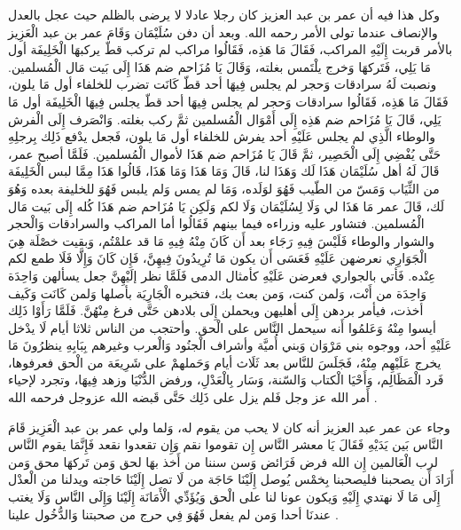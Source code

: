 وكل هذا فيه أن عمر بن عبد العزيز كان رجلا عادلا لا يرضى بالظلم حيث عجل بالعدل والإنصاف عندما تولى الأمر رحمه الله. وبعد أن دفن سُلَيْمَان وَقَامَ عمر بن عبد الْعَزِيز بالأمر قربت إِلَيْهِ المراكب، فَقَالَ مَا هَذِه، فَقَالُوا مراكب لم تركب قطّ يركبهَا الْخَلِيفَة أول مَا يَلِي، فَتَركهَا وَخرج يلْتَمس بغلته، وَقَالَ يَا مُزَاحم ضم هَذَا إِلَى بَيت مَال الْمُسلمين. ونصبت لَهُ سرادقات وَحجر لم يجلس فِيهَا أحد قطّ كَانَت تضرب للخلفاء أول مَا يلون، فَقَالَ مَا هَذِه، فَقَالُوا سرادقات وَحجر لم يجلس فِيهَا أحد قطّ يجلس فِيهَا الْخَلِيفَة أول مَا يَلِي، قَالَ يَا مُزَاحم ضم هَذِه إِلَى أَمْوَال الْمُسلمين ثمَّ ركب بغلته. وَانْصَرف إِلَى الْفرش والوطاء الَّذِي لم يجلس عَلَيْهِ أحد يفرش للخلفاء أول مَا يلون، فَجعل يدْفع ذَلِك بِرجلِهِ حَتَّى يُفْضِي إِلَى الْحَصِير، ثمَّ قَالَ يَا مُزَاحم ضم هَذَا لأموال الْمُسلمين. فَلَمَّا أصبح عمر، قَالَ لَهُ أهل سُلَيْمَان هَذَا لَك وَهَذَا لنا، قَالَ وَمَا هَذَا وَمَا هَذَا، قَالُوا هَذَا مِمَّا لبس الْخَلِيفَة من الثِّيَاب وَمَسّ من الطّيب فَهُوَ لوَلَده، وَمَا لم يمس وَلم يلبس فَهُوَ للخليفة بعده وَهُوَ لَك، قَالَ عمر مَا هَذَا لي وَلَا لِسُلَيْمَان وَلَا لكم وَلَكِن يَا مُزَاحم ضم هَذَا كُله إِلَى بَيت مَال الْمُسلمين. فتشاور عليه وزراءه فيما بينهم فَقَالُوا أما المراكب والسرادقات وَالْحجر والشوار والوطاء فَلَيْسَ فِيهِ رَجَاء بعد أَن كَانَ مِنْهُ فِيهِ مَا قد علمْتُم، وَبقيت خصْلَة هِيَ الْجَوَارِي نعرضهن عَلَيْهِ فَعَسَى أَن يكون مَا تُرِيدُونَ فِيهِنَّ، فَإِن كَانَ وَإِلَّا فَلَا طمع لكم عِنْده. فَأتي بالجواري فعرضن عَلَيْهِ كأمثال الدمى فَلَمَّا نظر إلَيْهِنَّ جعل يسألهن وَاحِدَة وَاحِدَة من أَنْت، وَلمن كنت، وَمن بعث بك، فتخبره الْجَارِيَة بأصلها وَلمن كَانَت وَكَيف أخذت، فيأمر بردهن إِلَى أهليهن ويحملن إِلَى بلادهن حَتَّى فرغ مِنْهُنَّ. فَلَمَّا رَأَوْا ذَلِك أيسوا مِنْهُ وَعَلمُوا أَنه سيحمل النَّاس على الْحق. وأحتجب من الناس ثلاثا أيام لَا يدْخل عَلَيْهِ أحد، ووجوه بني مَرْوَان وَبني أُميَّة وأشراف الْجنُود وَالْعرب وغيرهم بِبَابِهِ ينظرُونَ مَا يخرج عَلَيْهِم مِنْهُ، فَجَلَسَ للنَّاس بعد ثَلَاث أيام وَحَملهمْ على شَرِيعَة من الْحق فعرفوها، فَرد الْمَظَالِم، وَأَحْيَا الْكتاب وَالسّنة، وَسَار بِالْعَدْلِ، ورفض الدُّنْيَا وزهد فِيهَا، وتجرد لإحياء أَمر الله عز وجل فَلم يزل على ذَلِك حَتَّى قَبضه الله عزوجل فرحمه الله \cite{ibnAbdAlHakam_OmarIbnAbdAlAziz}.

وجاء عن عمر عبد العزيز أنه كان لا يحب من يقوم له، وَلما ولي عمر بن عبد الْعَزِيز قَامَ النَّاس بَين يَدَيْهِ فَقَالَ يَا معشر النَّاس إِن تقوموا نقم وَإِن تقعدوا نقعد فَإِنَّمَا يقوم النَّاس لرب الْعَالمين إِن الله فرض فَرَائض وَسن سننا من أَخذ بهَا لحق وَمن تَركهَا محق وَمن أَرَادَ أَن يصحبنا فليصحبنا بِخمْس يُوصل إِلَيْنَا حَاجَة من لَا تصل إِلَيْنَا حَاجته ويدلنا من الْعدْل إِلَى مَا لَا نهتدي إِلَيْهِ وَيكون عونا لنا على الْحق وَيُؤَدِّي الْأَمَانَة إِلَيْنَا وَإِلَى النَّاس وَلَا يغتب عندنَا أحدا وَمن لم يفعل فَهُوَ فِي حرج من صحبتنا وَالدُّخُول علينا \cite{ibnAbdAlHakam_OmarIbnAbdAlAziz}.

